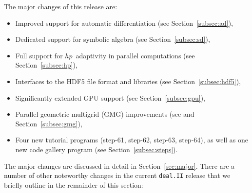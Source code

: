 \documentclass{ansarticle-preprint}
\newcommand{\specialword}[1]{\texttt{#1}}
\newcommand{\dealii}{{\specialword{deal.II}}\xspace}
\begin{document}
The major changes of this release are:
%
\begin{itemize}
  \item Improved support for automatic differentiation (see
    Section~\ref{subsec:ad}),
  \item Dedicated support for symbolic algebra (see
    Section~\ref{subsec:sd}),
  \item Full support for $hp$~adaptivity in parallel computations (see
    Section~\ref{subsec:hp}),
  \item Interfaces to the HDF5 file format and libraries (see
    Section~\ref{subsec:hdf5}),
  \item Significantly extended GPU support (see Section~\ref{subsec:gpu}),
  \item Parallel geometric multigrid (GMG) improvements (see
    \cite{ClevengerHeisterKanschatKronbichler2019} and
    Section~\ref{subsec:gmg}),
  \item Four new tutorial programs (step-61, step-62, step-63, step-64),
    as well as one new code gallery program (see
    Section~\ref{subsec:steps}).
\end{itemize}
%
The major changes are discussed in detail in Section~\ref{sec:major}. There
are a number of other noteworthy changes in the current \dealii{} release
that we briefly outline in the remainder of this section:
%
\end{document}
